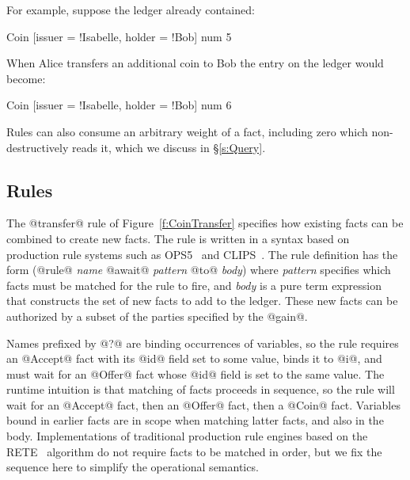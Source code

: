 For example, suppose the ledger already contained:
\begin{small}
\begin{code}
 Coin [issuer = !Isabelle, holder = !Bob]  num 5
\end{code}
\end{small}
%
When Alice transfers an additional coin to Bob the entry on the ledger would become:
\begin{small}
\begin{code}
 Coin [issuer = !Isabelle, holder = !Bob]  num 6
\end{code}
\end{small}
%
Rules can also consume an arbitrary weight of a fact, including zero which non-destructively reads it, which we discuss in \S\ref{s:Query}.



\subsection{Rules}
The @transfer@ rule of Figure~\ref{f:CoinTransfer} specifies how existing facts can be combined to create new facts. The rule is written in a syntax based on production rule systems such as OPS5~\cite{Forgy1981:OPS5} and CLIPS~\cite{Riley2017:CLIPS}. The rule definition has the form (@rule@ \emph{name} @await@ \emph{pattern} @to@ \emph{body}) where \emph{pattern} specifies which facts must be matched for the rule to fire, and \emph{body} is a pure term expression that constructs the set of new facts to add to the ledger. These new facts can be authorized by a subset of the parties specified by the @gain@.

Names prefixed by @?@ are binding occurrences of variables, so the rule requires an @Accept@ fact with its @id@ field set to some value, binds it to @i@, and must wait for an @Offer@ fact whose @id@ field is set to the same value. The runtime intuition is that matching of facts proceeds in sequence, so the rule will wait for an @Accept@ fact, then an @Offer@ fact, then a @Coin@ fact. Variables bound in earlier facts are in scope when matching latter facts, and also in the body. Implementations of traditional production rule engines based on the RETE~\cite{Forgy1981:RETE} algorithm do not require facts to be matched in order, but we fix the sequence here to simplify the operational semantics.

